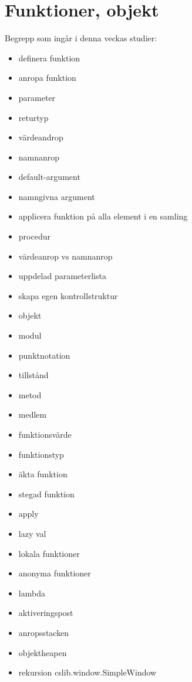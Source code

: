 \chapter{Funktioner, objekt}\label{chapter:W03}
Begrepp som ingår i denna veckas studier:
\begin{multicols}{2}\begin{itemize}[noitemsep,label={$\square$},leftmargin=*]
\item definera funktion
\item anropa funktion
\item parameter
\item returtyp
\item värdeandrop
\item namnanrop
\item default-argument
\item namngivna argument
\item applicera funktion på alla element i en samling
\item procedur
\item värdeanrop vs namnanrop
\item uppdelad parameterlista
\item skapa egen kontrollstruktur
\item objekt
\item modul
\item punktnotation
\item tillstånd
\item metod
\item medlem
\item funktionsvärde
\item funktionstyp
\item äkta funktion
\item stegad funktion
\item apply
\item lazy val
\item lokala funktioner
\item anonyma funktioner
\item lambda
\item aktiveringspost
\item anropsstacken
\item objektheapen
\item rekursion 
 cslib.window.SimpleWindow\end{itemize}\end{multicols}
